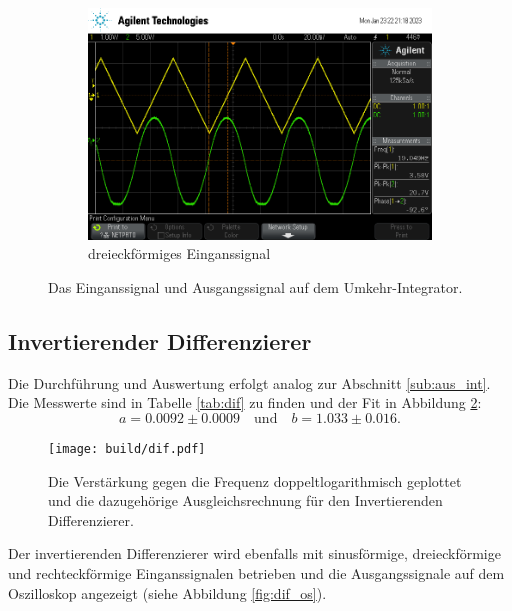 \begin{figure}
    \begin{subfigure}[b]{0.5\textwidth}
        \centering
        \includegraphics[width=\textwidth]{usb/Int_Drei.png}
        \caption{dreieckförmiges Einganssignal}
    \end{subfigure}
       \caption{Das Einganssignal und Ausgangssignal auf dem Umkehr-Integrator.}
       \label{fig:int_os}
\end{figure}
\FloatBarrier
\subsection{Invertierender Differenzierer}
Die Durchführung und Auswertung erfolgt analog zur Abschnitt \ref{sub:aus_int}.
Die Messwerte sind in Tabelle \ref{tab:dif} zu finden und der Fit in Abbildung \ref{fig:dif}:
\begin{equation}
    a =  0.0092 \pm 0.0009 \quad \text{und} \quad
    b =  1.033 \pm 0.016 .
\end{equation}

\begin{figure}
    \centering
    \texttt{[image: build/dif.pdf]}
    \caption{ Die Verstärkung gegen die Frequenz doppeltlogarithmisch geplottet 
    und die dazugehörige Ausgleichsrechnung für den Invertierenden Differenzierer.}
    \label{fig:dif}
\end{figure}
\FloatBarrier
\noindent Der invertierenden Differenzierer wird ebenfalls mit sinusförmige,
dreieckförmige und rechteckförmige Einganssignalen betrieben und die Ausgangssignale auf dem Oszilloskop
angezeigt (siehe Abbildung \ref{fig:dif_os}).

